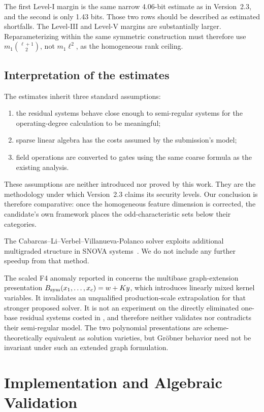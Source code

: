 \documentclass[11pt]{article}
\newcommand{\SNOVA}{\textsf{SNOVA}}
\begin{document}
The first Level-I margin is the same narrow 4.06-bit estimate as in Version~2.3, and the second is only 1.43 bits.  Those two rows should be described as estimated shortfalls.  The Level-III and Level-V margins are substantially larger.  Reparameterizing within the same symmetric construction must therefore use $m_1\binom{\ell+1}{2}$, not $m_1\ell^2$, as the homogeneous rank ceiling.

\subsection{Interpretation of the estimates}

The estimates inherit three standard assumptions:
\begin{enumerate}
\item the residual systems behave close enough to semi-regular systems for the operating-degree calculation to be meaningful;
\item sparse linear algebra has the costs assumed by the submission's model;
\item field operations are converted to gates using the same coarse formula as the existing analysis.
\end{enumerate}
These assumptions are neither introduced nor proved by this work.  They are the methodology under which Version~2.3 claims its security levels.  Our conclusion is therefore comparative: once the homogeneous feature dimension is corrected, the candidate's own framework places the odd-characteristic sets below their categories.

The Cabarcas--Li--Verbel--Villanueva-Polanco solver exploits additional multigraded structure in \SNOVA{} systems~\cite{Cabarcas2025SNOVA}.  We do not include any further speedup from that method.

The scaled F4 anomaly reported in  concerns the multibase
graph-extension presentation $B_{\rm sym}(x_1,\ldots,x_c)=w+Ky$, which
introduces linearly mixed kernel variables.  It invalidates an unqualified
production-scale extrapolation for that stronger proposed solver.  It is not an
experiment on the directly eliminated one-base residual systems costed in
, and therefore neither validates nor contradicts their
semi-regular model.  The two polynomial presentations are scheme-theoretically
equivalent as solution varieties, but Gr\"obner behavior need not be invariant
under such an extended graph formulation.

\section{Implementation and Algebraic Validation}\label{sec:validation}
\end{document}
